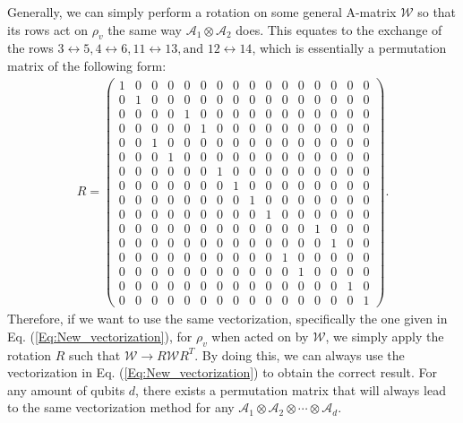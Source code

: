 \documentclass[12pt]{iopart}
\begin{document}
Generally, we can simply perform a rotation on some general A-matrix $\mathcal{W}$ so that its rows act on $\rho_v$ the same way $\mathcal{A}_1 \otimes \mathcal{A}_2$ does. This equates to the exchange of the rows $3 \leftrightarrow 5, 4 \leftrightarrow 6, 11 \leftrightarrow 13, \text{and } 12 \leftrightarrow 14$, which is essentially a permutation matrix of the following form:
\begin{align}
    \label{Eq:permutation}
    R =
    \left(
    \begin{array}{cccccccccccccccc}
        1 & 0 & 0 & 0 & 0 & 0 & 0 & 0 & 0 & 0 & 0 & 0 & 0 & 0 & 0 & 0 \\
        0 & 1 & 0 & 0 & 0 & 0 & 0 & 0 & 0 & 0 & 0 & 0 & 0 & 0 & 0 & 0 \\
        0 & 0 & 0 & 0 & 1 & 0 & 0 & 0 & 0 & 0 & 0 & 0 & 0 & 0 & 0 & 0 \\
        0 & 0 & 0 & 0 & 0 & 1 & 0 & 0 & 0 & 0 & 0 & 0 & 0 & 0 & 0 & 0 \\
        0 & 0 & 1 & 0 & 0 & 0 & 0 & 0 & 0 & 0 & 0 & 0 & 0 & 0 & 0 & 0 \\
        0 & 0 & 0 & 1 & 0 & 0 & 0 & 0 & 0 & 0 & 0 & 0 & 0 & 0 & 0 & 0 \\
        0 & 0 & 0 & 0 & 0 & 0 & 1 & 0 & 0 & 0 & 0 & 0 & 0 & 0 & 0 & 0 \\
        0 & 0 & 0 & 0 & 0 & 0 & 0 & 1 & 0 & 0 & 0 & 0 & 0 & 0 & 0 & 0 \\
        0 & 0 & 0 & 0 & 0 & 0 & 0 & 0 & 1 & 0 & 0 & 0 & 0 & 0 & 0 & 0 \\
        0 & 0 & 0 & 0 & 0 & 0 & 0 & 0 & 0 & 1 & 0 & 0 & 0 & 0 & 0 & 0 \\
        0 & 0 & 0 & 0 & 0 & 0 & 0 & 0 & 0 & 0 & 0 & 0 & 1 & 0 & 0 & 0 \\
        0 & 0 & 0 & 0 & 0 & 0 & 0 & 0 & 0 & 0 & 0 & 0 & 0 & 1 & 0 & 0 \\
        0 & 0 & 0 & 0 & 0 & 0 & 0 & 0 & 0 & 0 & 1 & 0 & 0 & 0 & 0 & 0 \\
        0 & 0 & 0 & 0 & 0 & 0 & 0 & 0 & 0 & 0 & 0 & 1 & 0 & 0 & 0 & 0 \\
        0 & 0 & 0 & 0 & 0 & 0 & 0 & 0 & 0 & 0 & 0 & 0 & 0 & 0 & 1 & 0 \\
        0 & 0 & 0 & 0 & 0 & 0 & 0 & 0 & 0 & 0 & 0 & 0 & 0 & 0 & 0 & 1 
    \end{array}
    \right).
\end{align}
Therefore, if we want to use the same vectorization, specifically the one given in Eq. (\ref{Eq:New_vectorization}), for $\rho_v$ when acted on by $\mathcal{W}$, we simply apply the rotation $R$ such that $\mathcal{W} \rightarrow R \mathcal{W} R^T$. By doing this, we can always use the vectorization in Eq. (\ref{Eq:New_vectorization}) to obtain the correct result. For any amount of qubits $d$, there exists a permutation matrix that will always lead to the same vectorization method for any $\mathcal{A}_1 \otimes \mathcal{A}_2 \otimes \cdots \otimes \mathcal{A}_d$. 
\end{document}
